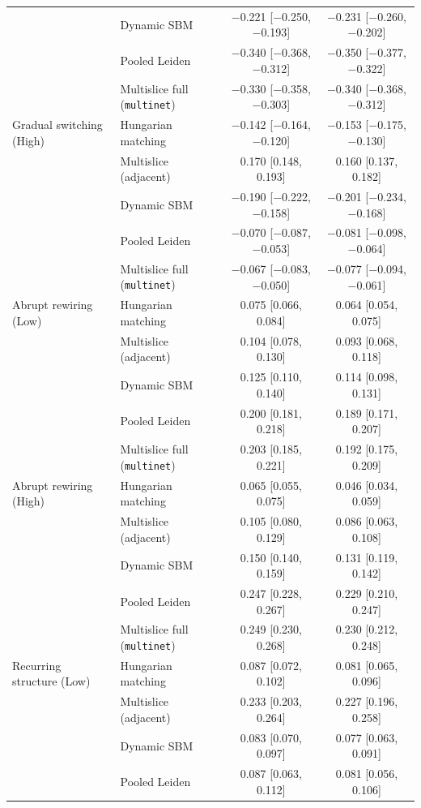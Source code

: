 \documentclass[11pt, letterpaper]{article}
\numberwithin{equation}{section}
\begin{document}
\begin{table}[htbp]
\begin{tabular}{llcc}
 & Dynamic SBM & $-$0.221 [$-$0.250, $-$0.193] & $-$0.231 [$-$0.260, $-$0.202] \\
 & Pooled Leiden & $-$0.340 [$-$0.368, $-$0.312] & $-$0.350 [$-$0.377, $-$0.322] \\
 & Multislice full (\texttt{multinet}) & $-$0.330 [$-$0.358, $-$0.303] & $-$0.340 [$-$0.368, $-$0.312] \\
Gradual switching (High) & Hungarian matching & $-$0.142 [$-$0.164, $-$0.120] & $-$0.153 [$-$0.175, $-$0.130] \\
 & Multislice (adjacent) & 0.170 [0.148, 0.193] & 0.160 [0.137, 0.182] \\
 & Dynamic SBM & $-$0.190 [$-$0.222, $-$0.158] & $-$0.201 [$-$0.234, $-$0.168] \\
 & Pooled Leiden & $-$0.070 [$-$0.087, $-$0.053] & $-$0.081 [$-$0.098, $-$0.064] \\
 & Multislice full (\texttt{multinet}) & $-$0.067 [$-$0.083, $-$0.050] & $-$0.077 [$-$0.094, $-$0.061] \\
Abrupt rewiring (Low) & Hungarian matching & 0.075 [0.066, 0.084] & 0.064 [0.054, 0.075] \\
 & Multislice (adjacent) & 0.104 [0.078, 0.130] & 0.093 [0.068, 0.118] \\
 & Dynamic SBM & 0.125 [0.110, 0.140] & 0.114 [0.098, 0.131] \\
 & Pooled Leiden & 0.200 [0.181, 0.218] & 0.189 [0.171, 0.207] \\
 & Multislice full (\texttt{multinet}) & 0.203 [0.185, 0.221] & 0.192 [0.175, 0.209] \\
Abrupt rewiring (High) & Hungarian matching & 0.065 [0.055, 0.075] & 0.046 [0.034, 0.059] \\
 & Multislice (adjacent) & 0.105 [0.080, 0.129] & 0.086 [0.063, 0.108] \\
 & Dynamic SBM & 0.150 [0.140, 0.159] & 0.131 [0.119, 0.142] \\
 & Pooled Leiden & 0.247 [0.228, 0.267] & 0.229 [0.210, 0.247] \\
 & Multislice full (\texttt{multinet}) & 0.249 [0.230, 0.268] & 0.230 [0.212, 0.248] \\
Recurring structure (Low) & Hungarian matching & 0.087 [0.072, 0.102] & 0.081 [0.065, 0.096] \\
 & Multislice (adjacent) & 0.233 [0.203, 0.264] & 0.227 [0.196, 0.258] \\
 & Dynamic SBM & 0.083 [0.070, 0.097] & 0.077 [0.063, 0.091] \\
 & Pooled Leiden & 0.087 [0.063, 0.112] & 0.081 [0.056, 0.106] \\

\end{tabular}
\end{table}
\end{document}
